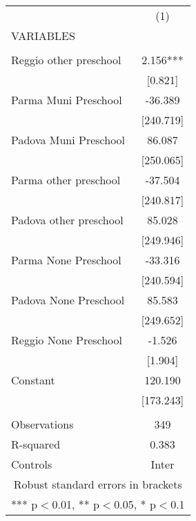\begin{tabular}{lc} \hline
 & (1) \\
VARIABLES &  \\ \hline
 &  \\
Reggio other preschool & 2.156*** \\
 & [0.821] \\
Parma Muni Preschool & -36.389 \\
 & [240.719] \\
Padova Muni Preschool & 86.087 \\
 & [250.065] \\
Parma other preschool & -37.504 \\
 & [240.817] \\
Padova other preschool & 85.028 \\
 & [249.946] \\
Parma None Preschool & -33.316 \\
 & [240.594] \\
Padova None Preschool & 85.583 \\
 & [249.652] \\
Reggio None Preschool & -1.526 \\
 & [1.904] \\
Constant & 120.190 \\
 & [173.243] \\
 &  \\
Observations & 349 \\
R-squared & 0.383 \\
 Controls & Inter \\ \hline
\multicolumn{2}{c}{ Robust standard errors in brackets} \\
\multicolumn{2}{c}{ *** p$<$0.01, ** p$<$0.05, * p$<$0.1} \\
\end{tabular}
